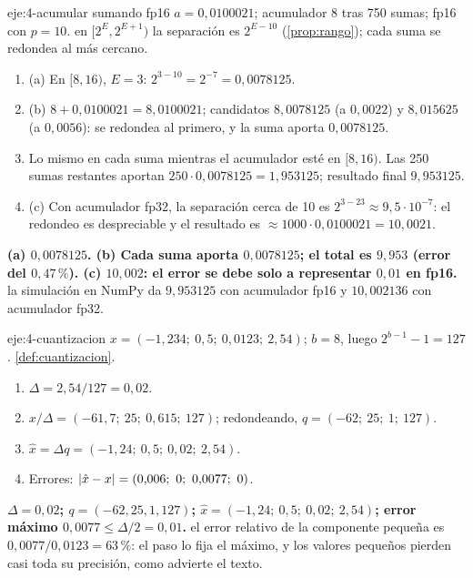 \begin{solucion}{eje:4-acumular}
\datos sumando fp16 $a=0{,}0100021$; acumulador $8$ tras 750 sumas; fp16 con $p=10$.
\planteamiento en $[2^{E},2^{E+1})$ la separación es $2^{E-10}$ (\cref{prop:rango}); cada suma se redondea al más cercano.
\pasos
\begin{enumerate}[label=\arabic*.]
  \item (a) En $[8,16)$, $E=3$: $2^{3-10}=2^{-7}=0{,}0078125$.
  \item (b) $8+0{,}0100021=8{,}0100021$; candidatos $8{,}0078125$ (a $0{,}0022$) y $8{,}015625$ (a $0{,}0056$): se redondea al primero, y la suma aporta $0{,}0078125$.
  \item Lo mismo en cada suma mientras el acumulador esté en $[8,16)$. Las 250 sumas restantes aportan $250\cdot 0{,}0078125=1{,}953125$; resultado final $9{,}953125$.
  \item (c) Con acumulador fp32, la separación cerca de 10 es $2^{3-23}\approx 9{,}5\cdot 10^{-7}$: el redondeo es despreciable y el resultado es $\approx 1000\cdot 0{,}0100021=10{,}0021$.
\end{enumerate}
\resultado \textbf{(a) $0{,}0078125$. (b) Cada suma aporta $0{,}0078125$; el total es $9{,}953$ (error del $0{,}47\,\%$). (c) $10{,}002$: el error se debe solo a representar $0{,}01$ en fp16.}
\comprobacion la simulación en NumPy da $9{,}953125$ con acumulador fp16 y $10{,}002136$ con acumulador fp32.
\end{solucion}

\begin{solucion}{eje:4-cuantizacion}
\datos $x=(-1{,}234;\ 0{,}5;\ 0{,}0123;\ 2{,}54)$; $b=8$, luego $2^{b-1}-1=127$.
\planteamiento \cref{def:cuantizacion}.
\pasos
\begin{enumerate}[label=\arabic*.]
  \item $\Delta=2{,}54/127=0{,}02$.
  \item $x/\Delta=(-61{,}7;\ 25;\ 0{,}615;\ 127)$; redondeando, $q=(-62;\ 25;\ 1;\ 127)$.
  \item $\hat x=\Delta q=(-1{,}24;\ 0{,}5;\ 0{,}02;\ 2{,}54)$.
  \item Errores: $\abs{\hat x-x}=(0{,}006;\ 0;\ 0{,}0077;\ 0)$.
\end{enumerate}
\resultado \textbf{$\Delta=0{,}02$; $q=(-62,25,1,127)$; $\hat x=(-1{,}24;\ 0{,}5;\ 0{,}02;\ 2{,}54)$; error máximo $0{,}0077\le\Delta/2=0{,}01$.}
\comprobacion el error relativo de la componente pequeña es $0{,}0077/0{,}0123=63\,\%$: el paso lo fija el máximo, y los valores pequeños pierden casi toda su precisión, como advierte el texto.
\end{solucion}

